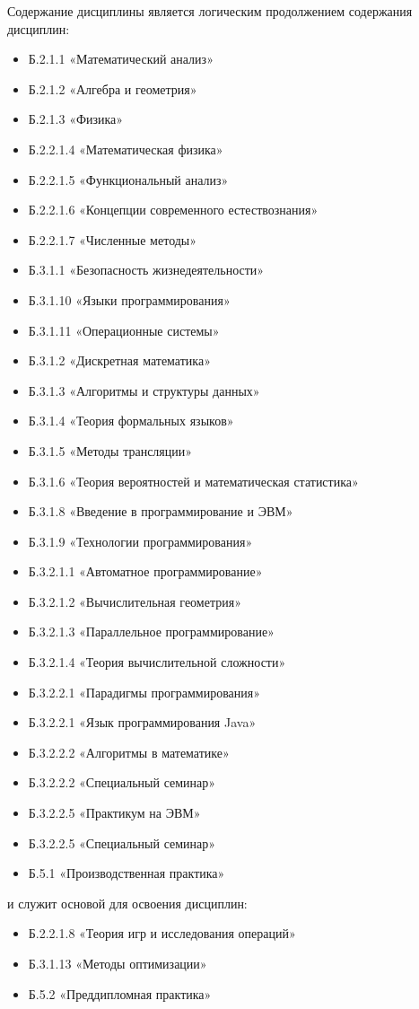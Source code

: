 Содержание дисциплины является логическим продолжением содержания дисциплин: \begin{itemize}
\item Б.2.1.1 «Математический анализ»\item Б.2.1.2 «Алгебра и геометрия»\item Б.2.1.3 «Физика»\item Б.2.2.1.4 «Математическая физика»\item Б.2.2.1.5 «Функциональный анализ»\item Б.2.2.1.6 «Концепции современного естествознания»\item Б.2.2.1.7 «Численные методы»\item Б.3.1.1 «Безопасность жизнедеятельности»\item Б.3.1.10 «Языки программирования»\item Б.3.1.11 «Операционные системы»\item Б.3.1.2 «Дискретная математика»\item Б.3.1.3 «Алгоритмы и структуры данных»\item Б.3.1.4 «Теория формальных языков»\item Б.3.1.5 «Методы трансляции»\item Б.3.1.6 «Теория вероятностей и математическая статистика»\item Б.3.1.8 «Введение в программирование и ЭВМ»\item Б.3.1.9 «Технологии программирования»\item Б.3.2.1.1 «Автоматное программирование»\item Б.3.2.1.2 «Вычислительная геометрия»\item Б.3.2.1.3 «Параллельное программирование»\item Б.3.2.1.4 «Теория вычислительной сложности»\item Б.3.2.2.1 «Парадигмы программирования»\item Б.3.2.2.1 «Язык программирования Java»\item Б.3.2.2.2 «Алгоритмы в математике»\item Б.3.2.2.2 «Специальный семинар»\item Б.3.2.2.5 «Практикум на ЭВМ»\item Б.3.2.2.5 «Специальный семинар»\item Б.5.1 «Производственная практика»
\end{itemize} и служит основой для освоения дисциплин: \begin{itemize}
\item Б.2.2.1.8 «Теория игр и исследования операций»\item Б.3.1.13 «Методы оптимизации»\item Б.5.2 «Преддипломная практика»
\end{itemize}

